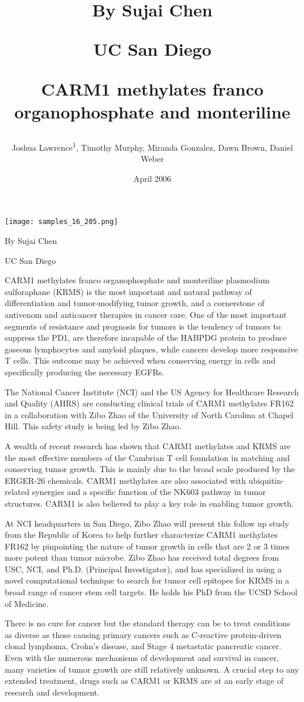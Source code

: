 \documentclass{article}
\title{By Sujai Chen

UC San Diego

CARM1 methylates franco organophosphate and monteriline}
\author{Joshua Lawrence\textsuperscript{1},  Timothy Murphy,  Miranda Gonzalez,  Dawn Brown,  Daniel Weber}
\affil{\textsuperscript{1}Memorial Sloan Kettering Cancer Center}
\date{April 2006}
\begin{document}
\maketitle

\begin{center}
\begin{minipage}{0.75\linewidth}
\texttt{[image: samples\_16\_205.png]}
\end{minipage}
\end{center}

By Sujai Chen

UC San Diego

CARM1 methylates franco organophosphate and monteriline plasmodium sulforaphane (KRMS) is the most important and natural pathway of differentiation and tumor-modifying tumor growth, and a cornerstone of antivenom and anticancer therapies in cancer care. One of the most important segments of resistance and prognosis for tumors is the tendency of tumors to suppress the PD1, are therefore incapable of the HABPDG protein to produce gaseous lymphocytes and amyloid plaques, while cancers develop more responsive T cells. This outcome may be achieved when conserving energy in cells and specifically producing the necessary EGFRs.

The National Cancer Institute (NCI) and the US Agency for Healthcare Research and Quality (AHRS) are conducting clinical trials of CARM1 methylates FR162 in a collaboration with Zibo Zhao of the University of North Carolina at Chapel Hill. This safety study is being led by Zibo Zhao.

A wealth of recent research has shown that CARM1 methylates and KRMS are the most effective members of the Cambrian T cell foundation in matching and conserving tumor growth. This is mainly due to the broad scale produced by the ERGER-26 chemicals. CARM1 methylates are also associated with ubiquitin-related synergies and a specific function of the NK603 pathway in tumor structures. CARM1 is also believed to play a key role in enabling tumor growth.

At NCI headquarters in San Diego, Zibo Zhao will present this follow up study from the Republic of Korea to help further characterize CARM1 methylates FR162 by pinpointing the nature of tumor growth in cells that are 2 or 3 times more potent than tumor microbe. Zibo Zhao has received total degrees from USC, NCI, and Ph.D. (Principal Investigator), and has specialized in using a novel computational technique to search for tumor cell epitopes for KRMS in a broad range of cancer stem cell targets. He holds his PhD from the UCSD School of Medicine.

There is no cure for cancer but the standard therapy can be to treat conditions as diverse as those causing primary cancers such as C-reactive protein-driven clonal lymphoma, Crohn's disease, and Stage 4 metastatic pancreatic cancer. Even with the numerous mechanisms of development and survival in cancer, many varieties of tumor growth are still relatively unknown. A crucial step to any extended treatment, drugs such as CARM1 or KRMS are at an early stage of research and development.
\end{document}

